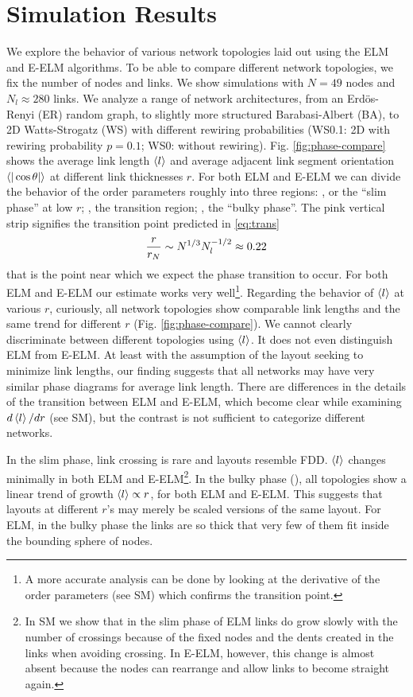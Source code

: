 \documentclass[nofootinbib,preprint,endfloats]{revtex4} %
\newcommand{\RNum}[1]{\uppercase\expandafter{\romannumeral #1\relax}}
\begin{document}
\section{Simulation Results}
We explore the behavior of various network topologies laid out using the ELM and E-ELM algorithms. 
To be able to compare different network topologies, we fix the number of nodes and links. We show simulations with $N=49$ nodes and $N_l\approx 280$ links. 
We analyze a range of network architectures, from an Erd\"os-Renyi (ER) random graph, to slightly more structured Barabasi-Albert (BA), to 2D Watts-Strogatz (WS) with different rewiring probabilities (WS0.1: 2D with rewiring probability $p=0.1$; WS0: without rewiring). Fig. \ref{fig:phase-compare} shows the average link length $\left<l\right>$ and average adjacent link segment orientation $\be{|\cos\theta|}$ at different link thicknesses $r$. For both ELM and E-ELM we can divide the behavior of the order parameters roughly into three regions: \RNum{1}, or the ``slim phase'' at low $r$; \RNum{2}, the transition region; \RNum{3}, the ``bulky phase''. The pink vertical strip signifies the transition point predicted in \eqref{eq:trans} 
\[{r\over r_N} \sim N^{1/3} N_l^{-1/2}\approx 0.22\]
that is the point near which we expect the phase transition to occur. 
For both ELM and E-ELM our estimate works very well\footnote{A more accurate analysis can be done by looking at the derivative of the order parameters (see SM) which confirms the transition point.}. 
Regarding the behavior of $\left<l\right>$ at various $r$, curiously, all network topologies show comparable link lengths and the same trend for different $r$ (Fig. \ref{fig:phase-compare}).
We cannot clearly discriminate between different topologies using $\left<l\right>$. 
It does not even distinguish ELM from E-ELM. 
At least with the assumption of the layout seeking to minimize link lengths, our finding suggests that all networks may have very similar phase diagrams for average link length. 
There are differences in the details of the transition between ELM and E-ELM, which become clear while examining $ d\left<l\right>/dr$ (see SM), but the contrast is not sufficient to categorize different networks. 

In the slim phase, link crossing is rare and layouts resemble FDD.
$\left<l\right>$ changes minimally in both ELM and E-ELM\footnote{
In SM we show that in the slim phase of ELM links do grow slowly with the number of crossings because of the fixed nodes and the dents created in the links when avoiding crossing. 
In E-ELM, however, this change is almost absent because the nodes can rearrange and allow links to become straight again.}. 
In the bulky phase (\RNum{3}), all topologies show a linear trend of growth $\left<l\right> \propto r$, for both ELM and E-ELM.
This suggests that layouts at different $r$'s may merely be scaled versions of the same layout.
For ELM, %
in the bulky phase the links are so thick that very few of them fit inside the bounding sphere of nodes. 
\end{document}
